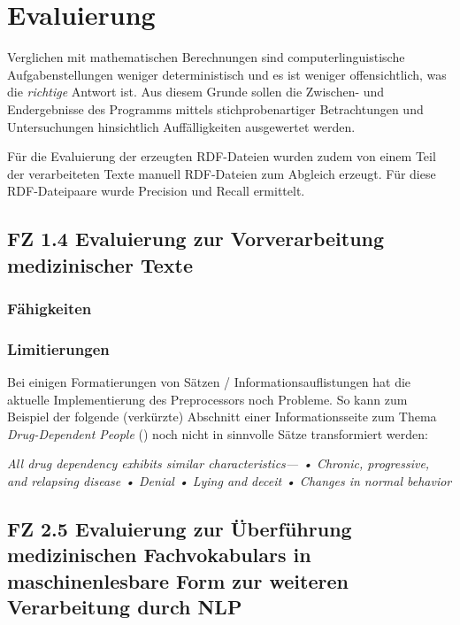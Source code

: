 \chapter{Evaluierung}
\label{ch:evaluierung}

Verglichen mit mathematischen Berechnungen sind computerlinguistische Aufgabenstellungen weniger deterministisch und es ist weniger offensichtlich, was die \emph{richtige} Antwort ist.  Aus diesem Grunde sollen die Zwischen- und Endergebnisse des Programms mittels stichprobenartiger Betrachtungen und Untersuchungen hinsichtlich Auffälligkeiten ausgewertet werden. 

Für die Evaluierung der erzeugten RDF-Dateien wurden zudem von einem Teil der verarbeiteten Texte manuell RDF-Dateien zum Abgleich erzeugt. Für diese RDF-Dateipaare wurde Precision und Recall ermittelt.


\section{FZ 1.4 Evaluierung zur Vorverarbeitung medizinischer Texte}
\label{sec:FZ1.4} 

\subsection{Fähigkeiten}


\subsection{Limitierungen} 
Bei einigen Formatierungen von Sätzen / Informationsauflistungen hat die aktuelle Implementierung des Preprocessors noch Probleme.
So kann zum Beispiel der folgende (verkürzte) Abschnitt einer Informationsseite zum Thema \emph{Drug-Dependent People} (\cite{drug_dependent_people}) noch nicht in sinnvolle Sätze transformiert werden:\\
\begin{addmargin}{10pt}
	\emph{
	All drug dependency exhibits similar characteristics— • Chronic, progressive, and relapsing disease • Denial • Lying and deceit • Changes in normal behavior
	}
\end{addmargin}
\vspace*{5mm}





\section[FZ 2.5 Evaluierung zur Überführung med. Fachvokabulars]{FZ 2.5 Evaluierung zur Überführung medizinischen Fachvokabulars in maschinenlesbare Form zur weiteren Verarbeitung durch NLP}
\label{sec:FZ2.5} 

